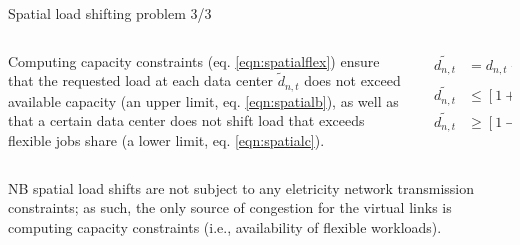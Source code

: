\begin{frame}{Spatial load shifting problem 3/3}

  {\footnotesize
  \begin{columns}

    \begin{column}{6cm}
      Computing capacity constraints (eq. \ref{eqn:spatialflex}) ensure that the requested load at each data center  $\widetilde{d}_{n,t}$ does not exceed available capacity (an upper limit, eq. \ref{eqn:spatialb}), as well as that a certain data center does not shift load that exceeds flexible jobs share (a lower limit, eq. \ref{eqn:spatialc}).
    \end{column}

  \begin{column}{7cm}
    \begin{subequations}
      \begin{align}
          \widetilde{d_{n,t}} &=  d_{n,t} + \sum_{\vartheta \in \Theta_n^{rec}}\delta_{\vartheta, t} - \sum_{\vartheta \in \Theta_n^{snd}}\delta_{\vartheta, t} \quad \forall n \in N_{DC}, t \in T \label{eqn:spatiala} \\
          \widetilde{d_{n,t}} &\le [1+f] \cdot d_{n,t}  \quad \forall n \in N_{DC}, t \in T \label{eqn:spatialb} \\
          \widetilde{d_{n,t}} &\ge [1-f] \cdot d_{n,t}  \quad \forall n \in N_{DC}, t \in T \label{eqn:spatialc}
      \end{align}
      \label{eqn:spatialflex}
      \end{subequations}
  \end{column}
  \end{columns}

  \vspace{-0.1cm}
  NB spatial load shifts are not subject to any eletricity network transmission constraints; as such, the only source of congestion for the virtual links is computing capacity constraints (i.e., availability of flexible workloads). \\

}
\end{frame}
